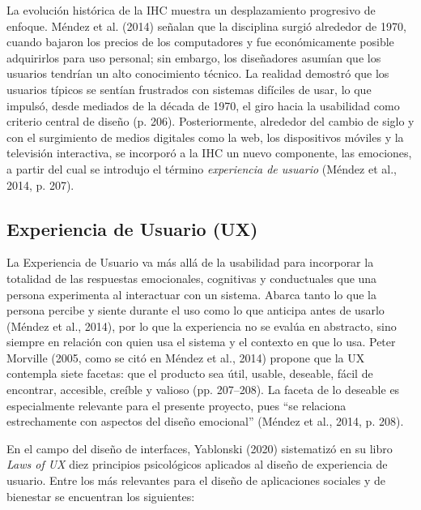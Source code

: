 La evolución histórica de la IHC muestra un desplazamiento progresivo de enfoque. Méndez et al. (2014) señalan que la disciplina surgió alrededor de 1970, cuando bajaron los precios de los computadores y fue económicamente posible adquirirlos para uso personal; sin embargo, los diseñadores asumían que los usuarios tendrían un alto conocimiento técnico. La realidad demostró que los usuarios típicos se sentían frustrados con sistemas difíciles de usar, lo que impulsó, desde mediados de la década de 1970, el giro hacia la usabilidad como criterio central de diseño (p. 206). Posteriormente, alrededor del cambio de siglo y con el surgimiento de medios digitales como la web, los dispositivos móviles y la televisión interactiva, se incorporó a la IHC un nuevo componente, las emociones, a partir del cual se introdujo el término \textit{experiencia de usuario} (Méndez et al., 2014, p. 207).

\subsection{Experiencia de Usuario (UX)}
La Experiencia de Usuario va más allá de la usabilidad para incorporar la totalidad de las respuestas emocionales, cognitivas y conductuales que una persona experimenta al interactuar con un sistema. Abarca tanto lo que la persona percibe y siente durante el uso como lo que anticipa antes de usarlo (Méndez et al., 2014), por lo que la experiencia no se evalúa en abstracto, sino siempre en relación con quien usa el sistema y el contexto en que lo usa. Peter Morville (2005, como se citó en Méndez et al., 2014) propone que la UX contempla siete facetas: que el producto sea útil, usable, deseable, fácil de encontrar, accesible, creíble y valioso (pp. 207--208). La faceta de lo deseable es especialmente relevante para el presente proyecto, pues ``se relaciona estrechamente con aspectos del diseño emocional'' (Méndez et al., 2014, p. 208).

En el campo del diseño de interfaces, Yablonski (2020) sistematizó en su libro \textit{Laws of UX} diez principios psicológicos aplicados al diseño de experiencia de usuario. Entre los más relevantes para el diseño de aplicaciones sociales y de bienestar se encuentran los siguientes:

